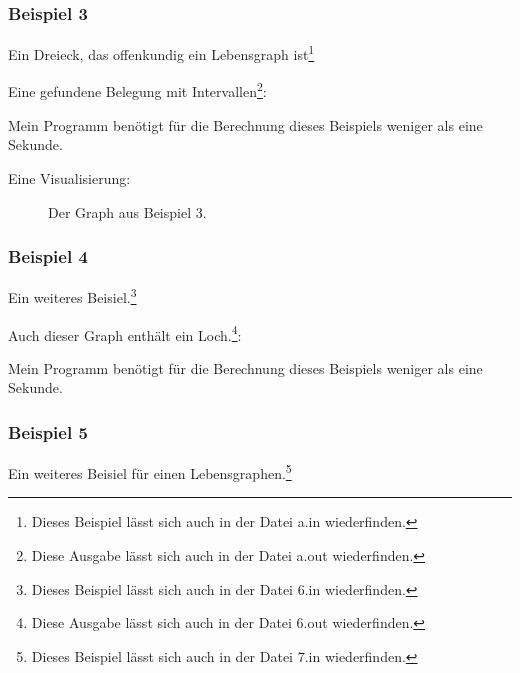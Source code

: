 \subsubsection*{Beispiel 3}
Ein Dreieck, das offenkundig ein Lebensgraph ist\footnote{Dieses Beispiel lässt sich auch in der Datei a.in wiederfinden.}

{\small

}

Eine gefundene Belegung mit Intervallen\footnote{Diese Ausgabe lässt sich auch in der Datei a.out wiederfinden.}:

{\small

}

Mein Programm benötigt für die Berechnung dieses Beispiels weniger als eine Sekunde.

Eine Visualisierung:
\begin{center}
\begin{figure}[h]
\caption{Der Graph aus Beispiel 3.}
\end{figure}
\end{center}

\subsubsection*{Beispiel 4}
Ein weiteres Beisiel.\footnote{Dieses Beispiel lässt sich auch in der Datei 6.in wiederfinden.}

{\small

}

Auch dieser Graph enthält ein Loch.\footnote{Diese Ausgabe lässt sich auch in der Datei 6.out wiederfinden.}:

{\small

}

Mein Programm benötigt für die Berechnung dieses Beispiels weniger als eine Sekunde.

\subsubsection*{Beispiel 5}
Ein weiteres Beisiel für einen Lebensgraphen.\footnote{Dieses Beispiel lässt sich auch in der Datei 7.in wiederfinden.}

